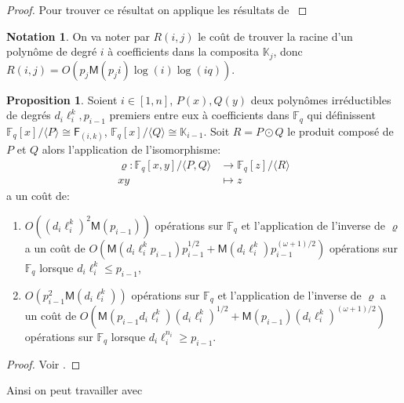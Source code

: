 \documentclass[10pt,a4paper]{book}
\theoremstyle{plain}
\theoremstyle{definition}
\theoremstyle{definition}
\theoremstyle{definition}
\newtheorem{prop}[thm]{Proposition}
\theoremstyle{definition}
\theoremstyle{remark}
\theoremstyle{remark}
\theoremstyle{definition}
\newtheorem{nota}[thm]{Notation}
\begin{document}
\begin{proof}
Pour trouver ce résultat on applique les résultats de \cite[Chapter 14.5]{vzGJG03}
\end{proof}

\begin{nota}
On va noter par $R(i,j)$ le coût de trouver la racine d'un polynôme de degré 
$i$ à coefficients dans la composita $\mathbb{K}_j$, donc 
$R(i,j)=O(p_j \mathsf{M}(p_ji)\log(i)\log(iq))$.
\end{nota}

\begin{prop}
\label{pro:iso:fie}
Soient $i \in [1,n]$, $P(x),Q(y)$ deux polynômes irréductibles de degrés 
$d_i\ell_i^{k},p_{i-1}$ premiers entre eux à coefficients dans $\mathbb{F}_q$
qui définissent $\mathbb{F}_q[x]/\langle P \rangle \cong \mathsf{F}_{(i,k)}$,
$\mathbb{F}_q[x]/\langle Q \rangle \cong \mathbb{K}_{i-1}$. Soit $R=P \odot 
Q$ le produit composé de $P$ et $Q$ alors l'application de l'isomorphisme:
\begin{equation*}
\begin{alignedat}{1}
\varrho : \mathbb{F}_q[x,y]/\langle P, Q \rangle & \rightarrow \mathbb{F}_q[z]/\langle R \rangle \\
xy & \mapsto z
\end{alignedat}
\end{equation*}
a un coût de:
\begin{enumerate}
\item $O((d_i\ell_i^{k})^2\mathsf{M}(p_{i-1}))$ opérations sur $\mathbb{F}_q$
 et l'application de l'inverse de $\varrho$ a un coût de 
 $O(\mathsf{M}(d_i\ell_i^{k}p_{i-1})p_{i-1}^{1/2}+\mathsf{M}(d_i\ell_i^{k})p_{i-1}^{(\omega+1)/2})$ 
opérations sur $\mathbb{F}_q$ lorsque 
$d_i\ell_i^{k} \leqslant p_{i-1}$,
\item $O(p_{i-1}^2\mathsf{M}(d_i\ell_i^{k}))$ opérations sur $\mathbb{F}_q$ 
et l'application de l'inverse de $\varrho$ a un coût de 
$O(\mathsf{M}(p_{i-1}d_i\ell_i^{k})(d_i\ell_i^{k})^{1/2}+\mathsf{M}(p_{i-1})(d_i\ell_i^{k})^{(\omega+1)/2})$ 
opérations sur $\mathbb{F}_q$ lorsque $d_i\ell_i^{n_i} \geqslant p_{i-1}$.
\end{enumerate}
\end{prop}
\begin{proof}
Voir \cite{DeFeoDoliskaniSchost14}.
\end{proof}


Ainsi on peut travailler avec 
\end{document}

